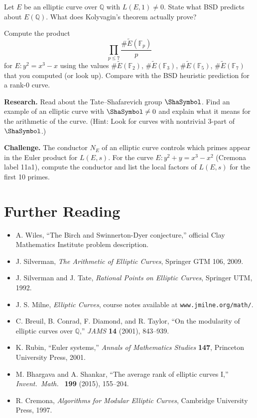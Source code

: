 \begin{exercise}
Let $E$ be an elliptic curve over $\mathbb{Q}$ with $L(E, 1) \neq 0$. State what BSD predicts about $E(\mathbb{Q})$. What does Kolyvagin's theorem actually prove?
\end{exercise}

\begin{exercise}
Compute the product
\[
\prod_{p \le 7} \frac{\#\widetilde{E}(\mathbb{F}_p)}{p}
\]
for $E: y^2 = x^3 - x$ using the values $\#\widetilde{E}(\mathbb{F}_2)$, $\#\widetilde{E}(\mathbb{F}_3)$, $\#\widetilde{E}(\mathbb{F}_5)$, $\#\widetilde{E}(\mathbb{F}_7)$ that you computed (or look up). Compare with the BSD heuristic prediction for a rank-0 curve.
\end{exercise}

\begin{exercise}
\textbf{Research.} Read about the Tate--Shafarevich group $\Sha$. Find an example of an elliptic curve with $\Sha \neq 0$ and explain what it means for the arithmetic of the curve. (Hint: Look for curves with nontrivial 3-part of $\Sha$.)
\end{exercise}

\begin{exercise}
\textbf{Challenge.} The conductor $N_E$ of an elliptic curve controls which primes appear in the Euler product for $L(E, s)$. For the curve $E: y^2 + y = x^3 - x^2$ (Cremona label 11a1), compute the conductor and list the local factors of $L(E, s)$ for the first 10 primes.
\end{exercise}

\section{Further Reading}

\begin{itemize}
\item A. Wiles, ``The Birch and Swinnerton-Dyer conjecture,'' official Clay Mathematics Institute problem description.
\item J. Silverman, \textit{The Arithmetic of Elliptic Curves}, Springer GTM 106, 2009.
\item J. Silverman and J. Tate, \textit{Rational Points on Elliptic Curves}, Springer UTM, 1992.
\item J. S. Milne, \textit{Elliptic Curves}, course notes available at \texttt{www.jmilne.org/math/}.
\item C. Breuil, B. Conrad, F. Diamond, and R. Taylor, ``On the modularity of elliptic curves over $\mathbb{Q}$,'' \textit{JAMS} \textbf{14} (2001), 843--939.
\item K. Rubin, ``Euler systems,'' \textit{Annals of Mathematics Studies} \textbf{147}, Princeton University Press, 2001.
\item M. Bhargava and A. Shankar, ``The average rank of elliptic curves I,'' \textit{Invent.\ Math.\ } \textbf{199} (2015), 155--204.
\item R. Cremona, \textit{Algorithms for Modular Elliptic Curves}, Cambridge University Press, 1997.
\end{itemize}

